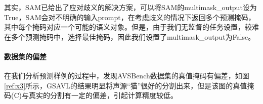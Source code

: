 \documentclass[12pt]{article}
\begin{document}
其实，SAM已给出了应对歧义的解决方案，可以将SAM的multimask\_output设为True，SAM会对不明确的输入prompt，在考虑歧义的情况下返回多个预测掩码，其中每个掩码对应一个可能的语义对象。但是，由于我们无监督的任务设置，较难在多个预测掩码中，选择最佳掩码，因此我们设置了multimask\_output为False。


\paragraph{数据集的偏差}
在我们分析预测样例的过程中，发现AVSBench数据集的真值掩码有偏差，如图\ref{ref:x3}所示，GSAVL的结果明显将声源“猫”很好的分割出来，但是该图的真值掩码(C)与真实的分割有一定的偏差，引起计算精度较低。
\begin{figure}[!h]
  \centering
\end{figure}
\end{document}
